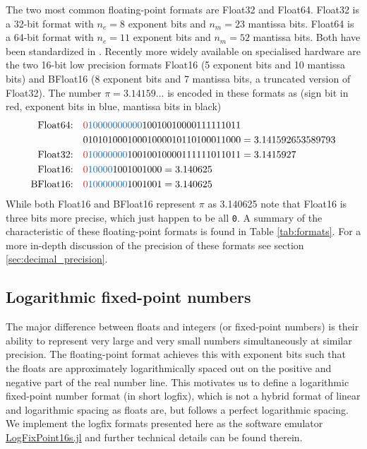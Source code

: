 The two most common floating-point formats are Float32 and Float64. Float32 is a 32-bit format with $n_e=8$ exponent bits and
$n_m=23$ mantissa bits. Float64 is a 64-bit format with $n_e=11$ exponent bits and $n_m=52$ mantissa bits. Both have been 
standardized in \cite{IEEE1985}. Recently more widely available on specialised hardware are the two 16-bit low precision formats
Float16 (5 exponent bits and 10 mantissa bits) and BFloat16 (8 exponent bits and 7 mantissa bits, a truncated version of Float32).
The number $\pi = 3.14159...$ is encoded in these formats as (sign bit in red, exponent bits in blue, mantissa bits in black)
\begin{align}
\text{Float64:}& \quad {\color{psign}0}{\color{pexpo}10000000000}10010010000111111011 \nonumber \\
			& \quad 01010100010001000010110100011000 = 3.141592653589793 \nonumber \\
\text{Float32:}& \quad {\color{psign}0}{\color{pexpo}10000000}10010010000111111011011 = 3.1415927 \nonumber \\
\text{Float16:}& \quad {\color{psign}0}{\color{pexpo}10000}1001001000 = 3.140625 \nonumber \\
\text{BFloat16:}& \quad {\color{psign}0}{\color{pexpo}10000000}1001001 = 3.140625
\end{align}
While both Float16 and BFloat16 represent $\pi$ as 3.140625 note that Float16 is three bits more precise, which just happen to be all \texttt{0}.
A summary of the characteristic of these floating-point formats is found in Table \ref{tab:formats}. For a more in-depth discussion of
the precision of these formats see section \ref{sec:decimal_precision}.

\subsection{Logarithmic fixed-point numbers}
\label{sec:logfixs}

The major difference between floats and integers (or fixed-point numbers) is their ability to represent very large and very small
numbers simultaneously at similar precision. The floating-point format achieves this with exponent bits such that the floats are
approximately logarithmically spaced out on the positive and negative part of the real number line. This motivates us to define
a logarithmic fixed-point number format (in short logfix), which is not a hybrid format of linear and logarithmic spacing as floats are, but
follows a perfect logarithmic spacing. We implement the logfix formats presented here as the software emulator 
\href{https://github.com/milankl/LogFixPoint16s.jl}{LogFixPoint16s.jl} and further technical details can be found therein.

